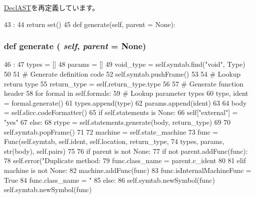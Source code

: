 \hyperlink{classslicc_1_1ast_1_1DeclAST_1_1DeclAST_a35b1a87f6fcbddeb5b793b0e415765f8}{DeclAST}を再定義しています。


\begin{DoxyCode}
43                                 :
44         return set()
45 
    def generate(self, parent = None):
\end{DoxyCode}
\hypertarget{classslicc_1_1ast_1_1FuncDeclAST_1_1FuncDeclAST_a4555d1cee0dccf3942ea35fe86de2e8e}{
\subsubsection[{generate}]{\setlength{\rightskip}{0pt plus 5cm}def generate ( {\em self}, \/   {\em parent} = {\ttfamily None})}}
\label{classslicc_1_1ast_1_1FuncDeclAST_1_1FuncDeclAST_a4555d1cee0dccf3942ea35fe86de2e8e}



\begin{DoxyCode}
46                                      :
47         types = []
48         params = []
49         void_type = self.symtab.find("void", Type)
50 
51         # Generate definition code
52         self.symtab.pushFrame()
53 
54         # Lookup return type
55         return_type = self.return_type.type
56 
57         # Generate function header
58         for formal in self.formals:
59             # Lookup parameter types
60             type, ident = formal.generate()
61             types.append(type)
62             params.append(ident)
63 
64         body = self.slicc.codeFormatter()
65         if self.statements is None:
66             self["external"] = "yes"
67         else:
68             rtype = self.statements.generate(body, return_type)
69 
70         self.symtab.popFrame()
71 
72         machine = self.state_machine
73         func = Func(self.symtab, self.ident, self.location, return_type,
74                     types, params, str(body), self.pairs)
75 
76         if parent is not None:
77             if not parent.addFunc(func):
78                 self.error("Duplicate method: %
79             func.class_name = parent.c_ident
80 
81         elif machine is not None:
82             machine.addFunc(func)
83             func.isInternalMachineFunc = True
84             func.class_name = "%
85         else:
86             self.symtab.newSymbol(func)
            self.symtab.newSymbol(func)
\end{DoxyCode}


